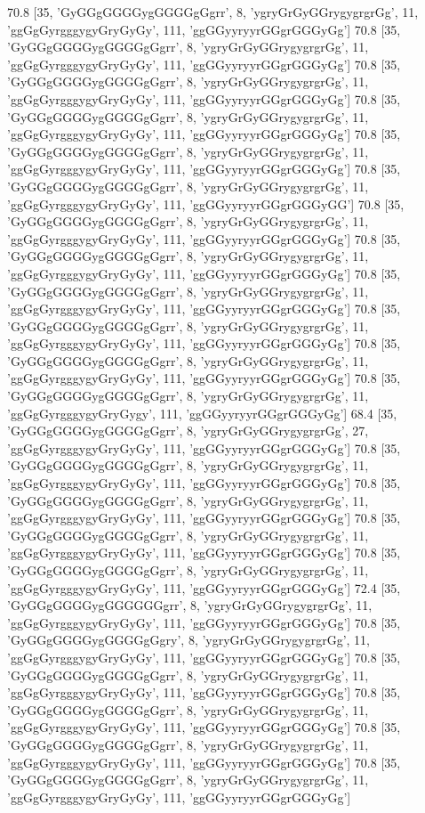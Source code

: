 70.8 [35, 'GyGGgGGGGygGGGGgGgrr', 8, 'ygryGrGyGGrygygrgrGg', 11, 'ggGgGyrgggygyGryGyGy', 111, 'ggGGyyryyrGGgrGGGyGg']
70.8 [35, 'GyGGgGGGGygGGGGgGgrr', 8, 'ygryGrGyGGrygygrgrGg', 11, 'ggGgGyrgggygyGryGyGy', 111, 'ggGGyyryyrGGgrGGGyGg']
70.8 [35, 'GyGGgGGGGygGGGGgGgrr', 8, 'ygryGrGyGGrygygrgrGg', 11, 'ggGgGyrgggygyGryGyGy', 111, 'ggGGyyryyrGGgrGGGyGg']
70.8 [35, 'GyGGgGGGGygGGGGgGgrr', 8, 'ygryGrGyGGrygygrgrGg', 11, 'ggGgGyrgggygyGryGyGy', 111, 'ggGGyyryyrGGgrGGGyGg']
70.8 [35, 'GyGGgGGGGygGGGGgGgrr', 8, 'ygryGrGyGGrygygrgrGg', 11, 'ggGgGyrgggygyGryGyGy', 111, 'ggGGyyryyrGGgrGGGyGg']
70.8 [35, 'GyGGgGGGGygGGGGgGgrr', 8, 'ygryGrGyGGrygygrgrGg', 11, 'ggGgGyrgggygyGryGyGy', 111, 'ggGGyyryyrGGgrGGGyGG']
70.8 [35, 'GyGGgGGGGygGGGGgGgrr', 8, 'ygryGrGyGGrygygrgrGg', 11, 'ggGgGyrgggygyGryGyGy', 111, 'ggGGyyryyrGGgrGGGyGg']
70.8 [35, 'GyGGgGGGGygGGGGgGgrr', 8, 'ygryGrGyGGrygygrgrGg', 11, 'ggGgGyrgggygyGryGyGy', 111, 'ggGGyyryyrGGgrGGGyGg']
70.8 [35, 'GyGGgGGGGygGGGGgGgrr', 8, 'ygryGrGyGGrygygrgrGg', 11, 'ggGgGyrgggygyGryGyGy', 111, 'ggGGyyryyrGGgrGGGyGg']
70.8 [35, 'GyGGgGGGGygGGGGgGgrr', 8, 'ygryGrGyGGrygygrgrGg', 11, 'ggGgGyrgggygyGryGyGy', 111, 'ggGGyyryyrGGgrGGGyGg']
70.8 [35, 'GyGGgGGGGygGGGGgGgrr', 8, 'ygryGrGyGGrygygrgrGg', 11, 'ggGgGyrgggygyGryGyGy', 111, 'ggGGyyryyrGGgrGGGyGg']
70.8 [35, 'GyGGgGGGGygGGGGgGgrr', 8, 'ygryGrGyGGrygygrgrGg', 11, 'ggGgGyrgggygyGryGygy', 111, 'ggGGyyryyrGGgrGGGyGg']
68.4 [35, 'GyGGgGGGGygGGGGgGgrr', 8, 'ygryGrGyGGrygygrgrGg', 27, 'ggGgGyrgggygyGryGyGy', 111, 'ggGGyyryyrGGgrGGGyGg']
70.8 [35, 'GyGGgGGGGygGGGGgGgrr', 8, 'ygryGrGyGGrygygrgrGg', 11, 'ggGgGyrgggygyGryGyGy', 111, 'ggGGyyryyrGGgrGGGyGg']
70.8 [35, 'GyGGgGGGGygGGGGgGgrr', 8, 'ygryGrGyGGrygygrgrGg', 11, 'ggGgGyrgggygyGryGyGy', 111, 'ggGGyyryyrGGgrGGGyGg']
70.8 [35, 'GyGGgGGGGygGGGGgGgrr', 8, 'ygryGrGyGGrygygrgrGg', 11, 'ggGgGyrgggygyGryGyGy', 111, 'ggGGyyryyrGGgrGGGyGg']
70.8 [35, 'GyGGgGGGGygGGGGgGgrr', 8, 'ygryGrGyGGrygygrgrGg', 11, 'ggGgGyrgggygyGryGyGy', 111, 'ggGGyyryyrGGgrGGGyGg']
72.4 [35, 'GyGGgGGGGygGGGGGGgrr', 8, 'ygryGrGyGGrygygrgrGg', 11, 'ggGgGyrgggygyGryGyGy', 111, 'ggGGyyryyrGGgrGGGyGg']
70.8 [35, 'GyGGgGGGGygGGGGgGgry', 8, 'ygryGrGyGGrygygrgrGg', 11, 'ggGgGyrgggygyGryGyGy', 111, 'ggGGyyryyrGGgrGGGyGg']
70.8 [35, 'GyGGgGGGGygGGGGgGgrr', 8, 'ygryGrGyGGrygygrgrGg', 11, 'ggGgGyrgggygyGryGyGy', 111, 'ggGGyyryyrGGgrGGGyGg']
70.8 [35, 'GyGGgGGGGygGGGGgGgrr', 8, 'ygryGrGyGGrygygrgrGg', 11, 'ggGgGyrgggygyGryGyGy', 111, 'ggGGyyryyrGGgrGGGyGg']
70.8 [35, 'GyGGgGGGGygGGGGgGgrr', 8, 'ygryGrGyGGrygygrgrGg', 11, 'ggGgGyrgggygyGryGyGy', 111, 'ggGGyyryyrGGgrGGGyGg']
70.8 [35, 'GyGGgGGGGygGGGGgGgrr', 8, 'ygryGrGyGGrygygrgrGg', 11, 'ggGgGyrgggygyGryGyGy', 111, 'ggGGyyryyrGGgrGGGyGg']

